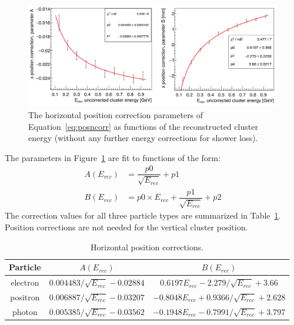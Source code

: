 \begin{figure}[htb]
  \centering
      \includegraphics[width=1.0\textwidth]{pics/performance/xposcorrPar.png}
  \caption[Horizontal position correction dependence for electrons]{The horizontal position correction parameters of Equation~\eqref{eq:posncorr} as functions of the reconstructed cluster energy (without any further energy corrections for shower loss).}
  \label{Figure:xposcorrPar}
\end{figure}

The parameters in Figure~\ref{Figure:xposcorrPar} are fit to functions of the form:
\begin{equation}
\label{eq:posnCpar}
\begin{split}
A(E_{rec}) & =  \dfrac{p0}{\sqrt{E_{rec}}}+p1\\
B(E_{rec}) & =  p0\times E_{rec} +\dfrac{p1}{\sqrt{E_{rec}}}+p2
\end{split}
\end{equation}
The correction values for all three particle types are summarized in Table~\ref{tab:horizPosCorr}. Position corrections are not needed for the vertical cluster position.

\begin{table}[htb]
\caption{Horizontal position corrections.}
\label{tab:horizPosCorr}
\centering
\begin{tabular}{|c|c|c|}
\toprule
Particle & $A(E_{rec})$ & $B(E_{rec})$ \\
\midrule
electron & $0.004483/\sqrt{E_{rec}}-0.02884$ & $0.6197E_{rec}-2.279/\sqrt{E_{rec}}+3.66$ \\
positron & $0.006887/\sqrt{E_{rec}}-0.03207$ & $-0.8048E_{rec}+0.9366/\sqrt{E_{rec}}+2.628$ \\
photon & $0.005385/\sqrt{E_{rec}}-0.03562$ & $-0.1948E_{rec}-0.7991/\sqrt{E_{rec}}+3.797$ \\
\bottomrule
\end{tabular}
\end{table}


